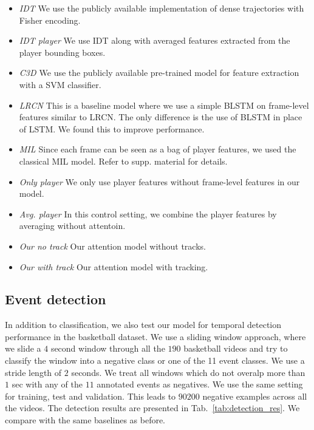 \documentclass[10pt,twocolumn,letterpaper]{article}
\begin{document}
\begin{itemize}
  \item \emph{IDT\cite{Wang_CVPR11}} We use the publicly available implementation of dense trajectories with
  Fisher encoding.
  
  \item \emph{IDT\cite{Wang_CVPR11} player} We use IDT along with averaged features extracted from the player
  bounding boxes.

  \item \emph{C3D \cite{Tran_arxiv14}} We use the publicly available pre-trained model for feature extraction
  with a SVM classifier.

  \item \emph{LRCN \cite{Donahue_arxiv14}} This is a baseline model where we use a simple BLSTM on frame-level features similar
  to LRCN. The only difference is the use of BLSTM in place of LSTM. We found this to improve
  performance.

  \item \emph{MIL \cite{}} Since each frame can be seen as a bag of player features, we used the
  classical MIL model. Refer to supp. material for details.

  \item \emph{Only player} We only use player features without frame-level
  features in our model.
 
  \item \emph{Avg. player} In this control setting, we combine the player features by averaging without
  attentoin.

  \item \emph{Our no track} Our attention model without tracks.

  \item \emph{Our with track} Our attention model with tracking.
\end{itemize}



\subsection{Event detection}
In addition to classification, we also test our model for temporal detection performance
in the basketball dataset.
We use a sliding window approach, where we slide a $4$ second window
through all the $190$ basketball videos and try to classify the window into a negative
class or one of the 11 event classes. We use a stride length of $2$ seconds.
We treat all windows which do not overalp more than $1$ sec with any of the $11$ annotated
events as negatives. We use the same setting for training, test and validation.
This leads to $90200$ negative examples across all the videos. The detection results
are presented in Tab.~\ref{tab:detection_res}. We compare with the same baselines as before.
\end{document}

